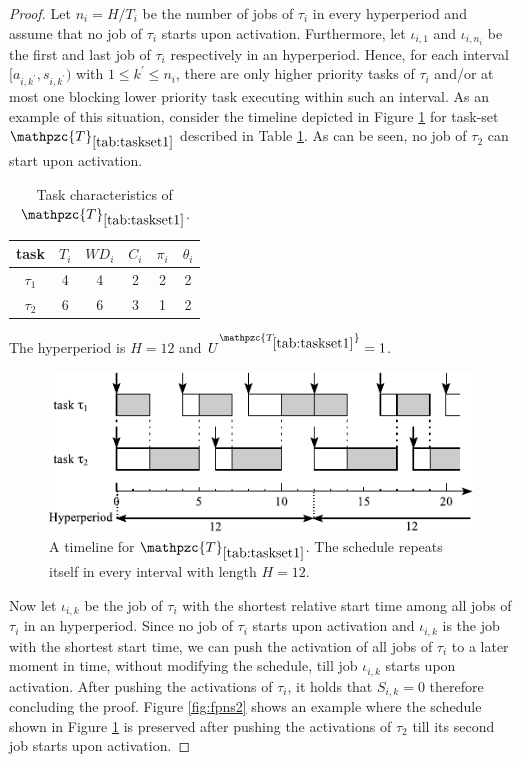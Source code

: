\documentclass[conference,compsoc]{IEEEtran}
\begin{document}
\begin{proof}
	Let $n_i = H/T_i$ be the number of jobs of $\tau_i$ in every hyperperiod and assume that no job of $\tau_i$ starts upon activation. Furthermore, let $\iota_{i,1}$ and $\iota_{i,n_i}$ be the first and last job of $\tau_i$ respectively in an hyperperiod. Hence, for each interval $[a_{i,k^{\prime}},s_{i,k^{\prime}})$ with $1 \leq k^{\prime} \leq n_i$, there are only higher priority tasks of $\tau_i$ and/or at most one blocking lower priority task executing within such an interval. As an example of this situation, consider the timeline depicted in Figure \ref{fig:fpns1} for task-set $\mathpzc{T}_{\ref{tab:taskset1}}$ described in Table \ref{tab:taskset1}. As can be seen, no job of $\tau_2$ can start upon activation.
	
		\begin{table}[h]
		\center
		\caption{Task characteristics of $\mathpzc{T}_{\ref{tab:taskset1}}$.}
		\label{tab:taskset1}
		\begin{tabular}{c | c c c c c}
			\hline 
			task & $T_i$ & $WD_i$ & $C_i$ & $\pi_i$ & $\theta_i$  \\ 
			\hline 
			$\tau_1$& 4 & 4 & 2  & 2 & 2\\ 
			$\tau_2$& 6 & 6 & 3  & 1 & 2\\ 
			\hline 
		\end{tabular}
		\small
		\item The hyperperiod is $H=12$ and $U^{\mathpzc{T_{\ref{tab:taskset1}}}}=1$.
	\end{table}
	
	\begin{figure}[h]
		\centering
		\includegraphics[width=1\linewidth]{fig/fpns1}
		\caption{A timeline for $\mathpzc{T}_{\ref{tab:taskset1}}$. The schedule repeats itself in every interval with length $H=12$.}
		\label{fig:fpns1}
	\end{figure}
	
	 Now let $\iota_{i,k}$ be the job of $\tau_i$ with the shortest relative start time among all jobs of $\tau_i$ in an hyperperiod. Since no job of $\tau_i$ starts upon activation and $\iota_{i,k}$ is the job with the shortest start time, we can push the activation of all jobs of $\tau_i$ to a later moment in time, without modifying the schedule, till job $\iota_{i,k}$ starts upon activation. After pushing the activations of $\tau_i$, it holds that $S_{i,k}=0$ therefore concluding the proof. Figure \ref{fig:fpns2} shows an example where the schedule shown in Figure \ref{fig:fpns1} is preserved after pushing the activations of $\tau_2$ till its second job starts upon activation.	
\end{proof}
\end{document}
